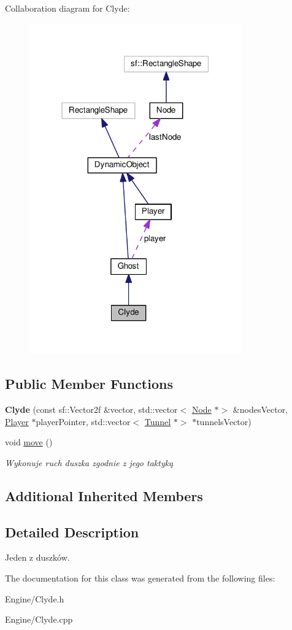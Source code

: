 Collaboration diagram for Clyde\+:\nopagebreak
\begin{figure}[H]
\begin{center}
\leavevmode
\includegraphics[width=259pt]{classClyde__coll__graph}
\end{center}
\end{figure}
\subsection*{Public Member Functions}
\begin{DoxyCompactItemize}
\item 
\mbox{\label{classClyde_a0d8ba4b9949399a78d40d86eef288aa6}} 
{\bfseries Clyde} (const sf\+::\+Vector2f \&vector, std\+::vector$<$ \hyperlink{classNode}{Node} $\ast$$>$ \&nodes\+Vector, \hyperlink{classPlayer}{Player} $\ast$player\+Pointer, std\+::vector$<$ \hyperlink{classTunnel}{Tunnel} $\ast$$>$ $\ast$tunnels\+Vector)
\item 
\mbox{\label{classClyde_a3ff46c7fcba7062ff7df5cc3ac92ad44}} 
void \hyperlink{classClyde_a3ff46c7fcba7062ff7df5cc3ac92ad44}{move} ()
\begin{DoxyCompactList}\small\item\em Wykonuje ruch duszka zgodnie z jego taktyką \end{DoxyCompactList}\end{DoxyCompactItemize}
\subsection*{Additional Inherited Members}


\subsection{Detailed Description}
Jeden z duszków. 

The documentation for this class was generated from the following files\+:\begin{DoxyCompactItemize}
\item 
Engine/Clyde.\+h\item 
Engine/Clyde.\+cpp\end{DoxyCompactItemize}
